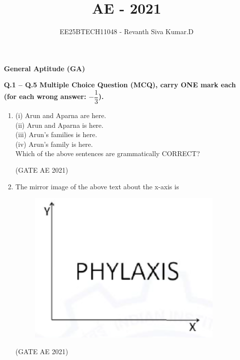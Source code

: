 \documentclass[journal,12pt,onecolumn]{IEEEtran}
\title{\LARGE \textbf{AE - 2021}}
\author{\Large EE25BTECH11048 - Revanth Siva Kumar.D}
\date{}
\theoremstyle{remark}
\begin{document}
\maketitle
\begin{flushleft}
\begin{center}
\large\textbf{General Aptitude (GA)}
\end{center}

\textbf{ Q.1 -- Q.5 Multiple Choice Question (MCQ), carry ONE mark each (for each wrong answer: $-\dfrac{1}{3}$).}

\begin{enumerate}
\item 
(i) Arun and Aparna are here. \\
(ii) Arun and Aparna is here. \\
(iii) Arun's families is here. \\
(iv) Arun's family is here. \\

Which of the above sentences are grammatically CORRECT?

\hfill (GATE AE 2021)

\begin{enumerate}
\end{enumerate}


\item 
The mirror image of the above text about the x-axis is \begin{figure}[H]
    \centering
    \includegraphics[width=0.5\columnwidth]{figs/Q2.png}
    \caption{}
    \label{fig:placeholder}
\end{figure}


\hfill (GATE AE 2021)


\end{enumerate}
\end{flushleft}
\end{document}

